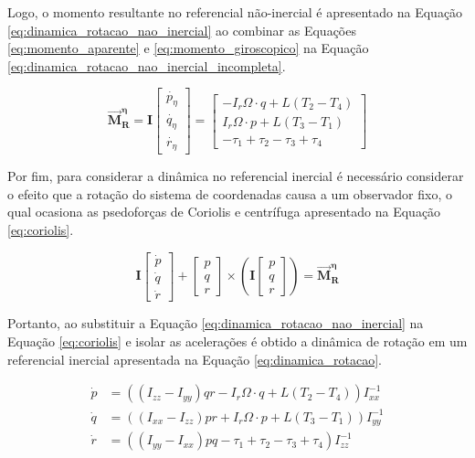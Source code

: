 \documentclass[main.tex]{subfiles}
\begin{document}
 Logo, o momento resultante no referencial não-inercial é apresentado na Equação \ref{eq:dinamica_rotacao_nao_inercial} ao combinar as Equações \ref{eq:momento_aparente} e \ref{eq:momento_giroscopico} na Equação \ref{eq:dinamica_rotacao_nao_inercial_incompleta}.

\begin{equation}\label{eq:dinamica_rotacao_nao_inercial}
	\boldsymbol{\vec{M}^\eta_R} = \boldsymbol{I} \begin{bmatrix}
		\dot{p_\eta}\\
		\dot{q_\eta}\\
		\dot{r_\eta}
	\end{bmatrix} = \begin{bmatrix}
	- I_r\Omega\cdot q + L(T_2 - T_4)\\
	I_r\Omega\cdot p + L(T_3 - T_1)\\
	-\tau_1 + \tau_2 - \tau_3 + \tau_4
	\end{bmatrix}
\end{equation}

Por fim, para considerar a dinâmica no referencial inercial é necessário considerar o efeito que a rotação do sistema de coordenadas causa a um observador fixo, o qual ocasiona as psedoforças de Coriolis e centrífuga \cite{classica:livro} apresentado na Equação \ref{eq:coriolis}.

\begin{equation}\label{eq:coriolis}
	\boldsymbol{I}\begin{bmatrix}
		\dot{p}\\
		\dot{q}\\
		\dot{r}
	\end{bmatrix} + \begin{bmatrix}
		p\\
		q\\
		r
	\end{bmatrix}\times\left(\boldsymbol{I}\begin{bmatrix}
	p\\
	q\\
	r
	\end{bmatrix}\right) = \boldsymbol{\vec{M}^\eta_R}
\end{equation}

Portanto, ao substituir a Equação \ref{eq:dinamica_rotacao_nao_inercial} na Equação \ref{eq:coriolis} e isolar as acelerações é obtido a dinâmica de rotação em um referencial inercial apresentada na Equação \ref{eq:dinamica_rotacao}.

\begin{equation}\label{eq:dinamica_rotacao}
	\begin{split}
		\dot{p} &= \left((I_{zz} - I_{yy})qr - I_r\Omega\cdot q + L(T_2 - T_4)\right)I_{xx}^{-1}\\
		\dot{q} &= \left((I_{xx} - I_{zz})pr + I_r\Omega\cdot p + L(T_3 - T_1)\right)I_{yy}^{-1}\\
		\dot{r} &= \left((I_{yy} - I_{xx})pq -\tau_1 + \tau_2 - \tau_3 + \tau_4\right)I_{zz}^{-1}\\
	\end{split}
\end{equation}
\end{document}
